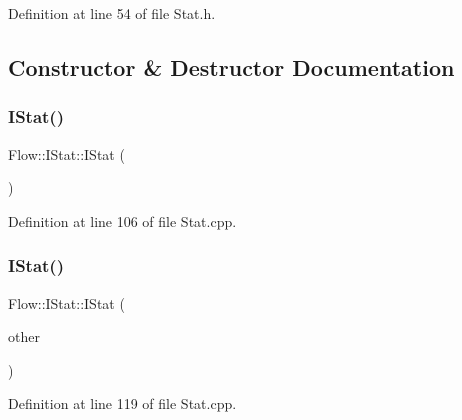 Definition at line 54 of file Stat.\+h.



\subsection{Constructor \& Destructor Documentation}
\hypertarget{class_flow_1_1_i_stat_ae9fdfde363f2c72f49cc12e6675b143d}{}\label{class_flow_1_1_i_stat_ae9fdfde363f2c72f49cc12e6675b143d} 
\subsubsection{\texorpdfstring{I\+Stat()}{IStat()}\hspace{0.1cm}{\footnotesize\ttfamily [1/3]}}
{\footnotesize\ttfamily Flow\+::\+I\+Stat\+::\+I\+Stat (\begin{DoxyParamCaption}{ }\end{DoxyParamCaption})}



Definition at line 106 of file Stat.\+cpp.

\hypertarget{class_flow_1_1_i_stat_ad1dbf438931a51b7f9c3435f63a782fd}{}\label{class_flow_1_1_i_stat_ad1dbf438931a51b7f9c3435f63a782fd} 
\subsubsection{\texorpdfstring{I\+Stat()}{IStat()}\hspace{0.1cm}{\footnotesize\ttfamily [2/3]}}
{\footnotesize\ttfamily Flow\+::\+I\+Stat\+::\+I\+Stat (\begin{DoxyParamCaption}\item[{const \hyperlink{class_flow_1_1_i_stat}{I\+Stat} \&}]{other }\end{DoxyParamCaption})}



Definition at line 119 of file Stat.\+cpp.

\hypertarget{class_flow_1_1_i_stat_a1511765ad0b6de79922c5edeff297960}{}\label{class_flow_1_1_i_stat_a1511765ad0b6de79922c5edeff297960} 
